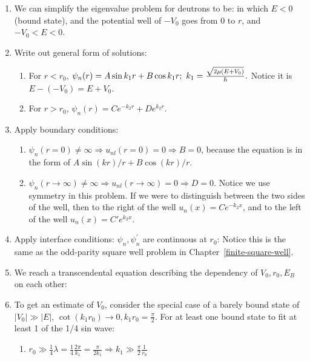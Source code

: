 \documentclass{school-22.101-notes}
\begin{document}
\begin{enumerate}
\item We can simplify the eigenvalue problem for deutrons to be:
in which $E<0$ (bound state), and the potential well of $-V_0$ goes from $0$ to $r$, and $-V_0 < E < 0$. 

\item Write out general form of solutions:  
\begin{enumerate}
\item For $r < r_0$, $ \psi_n (r) = A \sin k_1 r + B \cos k_1 r; \mbox{ } k_1 = \frac{\sqrt{2 \mu (E+V_0)}}{\hbar}.$
Notice it is $E - (-V_0) = E + V_0$. 

\item For $r > r_0$, $\psi_n (r) = C e^{-k_2 r} + D e^{k_2 r}$. 
\end{enumerate}

\item Apply boundary conditions:
\begin{enumerate}
\item $\psi_n (r=0) \neq \infty \Rightarrow  u_{nl} (r=0) = 0 \Rightarrow B = 0$, because the equation is in the form of $A \sin(kr)/r + B \cos (kr)/r$. 

\item $\psi_n (r \to \infty) \neq \infty \Rightarrow u_{nl} (r\to \infty) = 0 \Rightarrow D = 0$. Notice we use symmetry in this problem. If we were to distinguish between the two sides of the well, then to the right of the well $u_n(x) = C e^{-k_2 x}$, and to the left of the well $u_n (x) = C' e^{k_2 x}$. 
\end{enumerate}

\item Apply interface conditions: $\psi_n, \psi^{\prime}_n$ are continuous at $r_0$: 
Notice this is the same as the odd-parity square well problem in Chapter~\ref{finite-square-well}. 


\item We reach a transcendental equation describing the dependency of $V_0, r_0, E_B$ on each other:

\item To get an estimate of $V_0$, consider the special case of a barely bound state of $|V_0| \gg |E|$, $\cot (k_1 r_0) \to 0, k_1 r_0 = \frac{\pi}{2}$. For at least one bound state to fit at least 1 of the 1/4 sin wave: 
\begin{enumerate}
\item $ r_0 \gg \frac{1}{4}\lambda = \frac{1}{4}\frac{2 \pi}{k_1}  = \frac{\pi}{2k_1}  \Rightarrow k_1 \gg \frac{\pi}{2} \frac{1}{r_0} $


\end{enumerate}
\end{enumerate}
\end{document}
